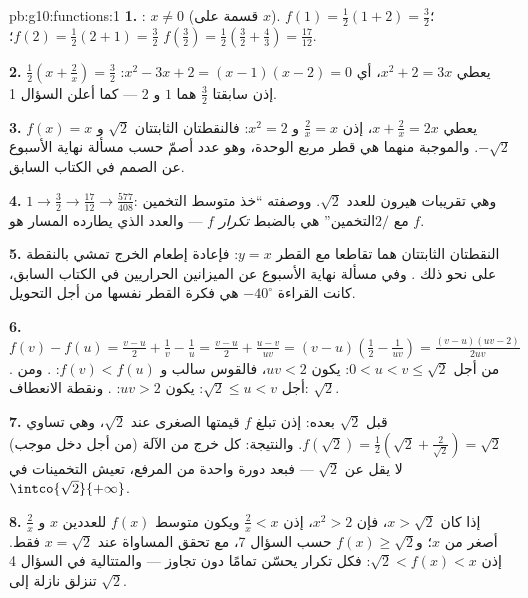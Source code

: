 \begin{solution}{pb:g10:functions:1}
\textbf{1.} : $x \neq 0$ (قسمة على $x$). $f(1) =
\frac12(1 + 2) = \frac32$؛ $f(2) = \frac12(2 + 1) = \frac32$؛
$f\!\left(\frac32\right) = \frac12\left(\frac32 +
\frac43\right) = \frac{17}{12}$.

\textbf{2.} $\frac12\left(x + \frac2x\right) = \frac32$ يعطي
$x^2 + 2 = 3x$، أي $x^2 - 3x + 2 = (x - 1)(x - 2) = 0$: إذن
سابقتا $\frac32$ هما $1$ و $2$ --- كما أعلن
السؤال 1.

\textbf{3.} $f(x) = x$ يعطي $x + \frac2x = 2x$، إذن
$\frac2x = x$ و $x^2 = 2$: فالنقطتان الثابتتان $\sqrt2$ و $-\sqrt2$.
والموجبة منهما هي قطر مربع الوحدة، وهو عدد أصمّ
حسب مسألة نهاية الأسبوع عن الصمم في الكتاب السابق.

\textbf{4.} $1 \to \frac32 \to \frac{17}{12} \to
\frac{577}{408}$: وهي تقريبات هيرون للعدد $\sqrt2$. ووصفته
``خذ متوسط التخمين مع $2/$التخمين'' هي بالضبط
\emph{تكرار  $f$} --- والعدد الذي
يطارده المسار هو   $f$.

\textbf{5.} النقطتان الثابتتان هما تقاطعا 
مع القطر $y = x$: فإعادة إطعام الخرج تمشي
بالنقطة على  نحو ذلك . وفي
مسألة نهاية الأسبوع عن الميزانين الحراريين في الكتاب السابق، كانت القراءة $-40^\circ$ هي
فكرة  القطر نفسها من أجل  التحويل.

\textbf{6.} $f(v) - f(u) = \frac{v - u}{2} + \frac1v - \frac1u
= \frac{v - u}{2} + \frac{u - v}{uv}
= (v - u)\left(\frac12 - \frac{1}{uv}\right)
= \frac{(v - u)(uv - 2)}{2uv}$. من أجل $0 < u < v \leq \sqrt2$:
يكون $uv < 2$، فالقوس سالب و $f(v) < f(u)$: .
ومن أجل $\sqrt2 \leq u < v$: يكون $uv > 2$: . ونقطة الانعطاف:
$\sqrt2$.

\textbf{7.}  قبل $\sqrt2$  بعده: إذن تبلغ $f$
قيمتها الصغرى عند $\sqrt2$، وهي تساوي
$f(\sqrt2) = \frac12\left(\sqrt2 + \frac{2}{\sqrt2}\right)
= \sqrt2$. والنتيجة: كل خرج من الآلة (من أجل دخل
موجب) لا يقل عن $\sqrt2$ --- فبعد دورة واحدة من المرفع،
تعيش التخمينات في $\intco{\sqrt2}{+\infty}$.

\textbf{8.} إذا كان $x > \sqrt2$، فإن $x^2 > 2$، إذن
$\frac2x < x$ ويكون متوسط $f(x)$ للعددين $x$ و $\frac2x$
أصغر من $x$؛ و$f(x) \geq \sqrt2$ حسب السؤال 7، مع
تحقق المساواة عند $x = \sqrt2$ فقط. إذن
$\sqrt2 < f(x) < x$: فكل تكرار يحسّن تمامًا دون
تجاوز --- والمتتالية في السؤال 4 تنزلق نازلة إلى
$\sqrt2$.


\end{solution}

